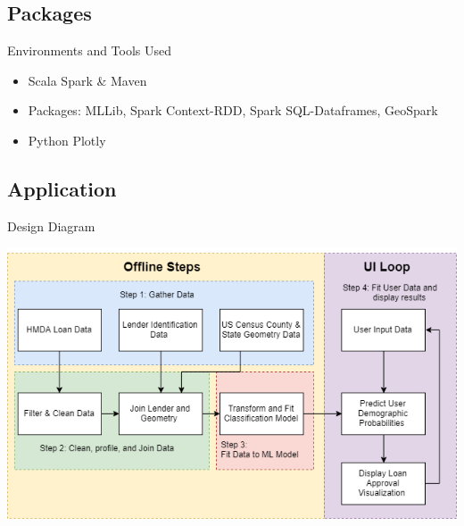 \documentclass{beamer}
\begin{document}
\subsection{Packages}

\begin{frame}{Environments and Tools Used}

\begin{itemize}
    \item Scala Spark \& Maven
    \item Packages: MLLib, Spark Context-RDD, Spark SQL-Dataframes, GeoSpark
    \item Python Plotly
\end{itemize}

\end{frame}

\subsection{Application}

\begin{frame}{Design Diagram}

\includegraphics[width=\linewidth]{SparkDesignDiagram.png}


\end{frame}
\end{document}

